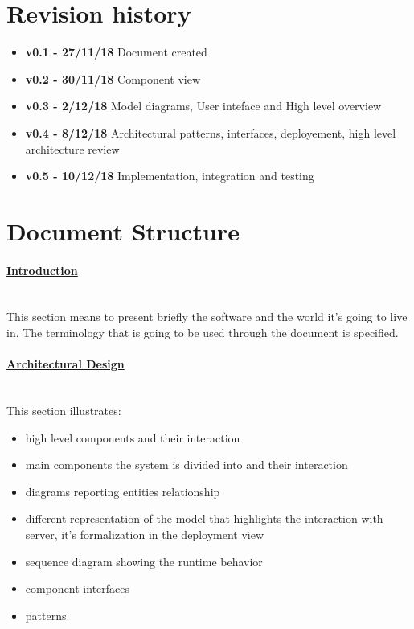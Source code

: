 \section{Revision history}
\begin{itemize}
\item \textbf{v0.1 - 27/11/18} Document created
\item \textbf{v0.2 - 30/11/18} Component view
\item \textbf{v0.3 - 2/12/18} Model diagrams, User inteface and High level overview
\item \textbf{v0.4 - 8/12/18} Architectural patterns, interfaces, deployement, high level architecture review
\item \textbf{v0.5 - 10/12/18} Implementation, integration and testing 
\end{itemize}
\section{Document Structure}
\paragraph{\hyperref[sect:introduction]{Introduction}} \mbox{}\\
This section means to present briefly the software and the world it’s going to live in. The terminology that is going to be used through the document is specified.
\paragraph{\hyperref[sect:architecturalDesign]{Architectural Design}} \mbox{}\\
This section illustrates:
\begin{itemize}
\item high level components and their interaction
\item main components the system is divided into and their interaction
\item diagrams reporting entities relationship
\item different representation of the model that highlights the interaction with server, it’s formalization in the deployment view
\item sequence diagram showing the runtime behavior 
\item component interfaces 
\item patterns.
\end{itemize}
